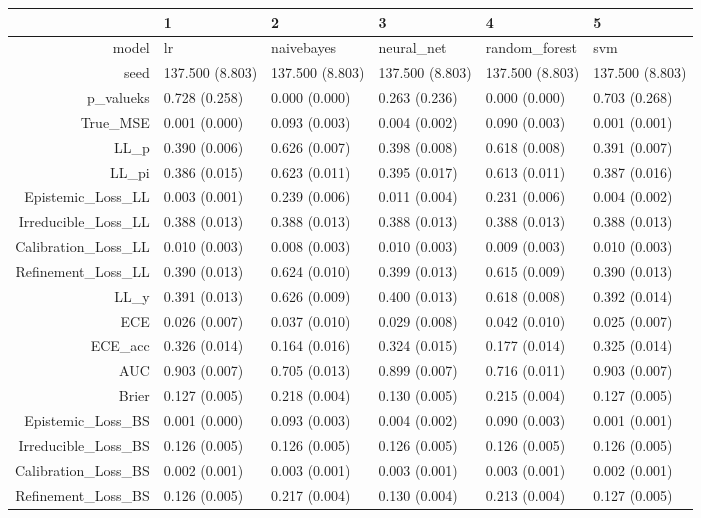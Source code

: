 \begin{table}[ht]
\centering
\begin{tabular}{rlllll}
  \hline
 & 1 & 2 & 3 & 4 & 5 \\ 
  \hline
model & lr & naivebayes & neural\_net & random\_forest & svm \\ 
  seed & 137.500 (8.803) & 137.500 (8.803) & 137.500 (8.803) & 137.500 (8.803) & 137.500 (8.803) \\ 
  p\_valueks & 0.728 (0.258) & 0.000 (0.000) & 0.263 (0.236) & 0.000 (0.000) & 0.703 (0.268) \\ 
  True\_MSE & 0.001 (0.000) & 0.093 (0.003) & 0.004 (0.002) & 0.090 (0.003) & 0.001 (0.001) \\ 
  LL\_p & 0.390 (0.006) & 0.626 (0.007) & 0.398 (0.008) & 0.618 (0.008) & 0.391 (0.007) \\ 
  LL\_pi & 0.386 (0.015) & 0.623 (0.011) & 0.395 (0.017) & 0.613 (0.011) & 0.387 (0.016) \\ 
  Epistemic\_Loss\_LL & 0.003 (0.001) & 0.239 (0.006) & 0.011 (0.004) & 0.231 (0.006) & 0.004 (0.002) \\ 
  Irreducible\_Loss\_LL & 0.388 (0.013) & 0.388 (0.013) & 0.388 (0.013) & 0.388 (0.013) & 0.388 (0.013) \\ 
  Calibration\_Loss\_LL & 0.010 (0.003) & 0.008 (0.003) & 0.010 (0.003) & 0.009 (0.003) & 0.010 (0.003) \\ 
  Refinement\_Loss\_LL & 0.390 (0.013) & 0.624 (0.010) & 0.399 (0.013) & 0.615 (0.009) & 0.390 (0.013) \\ 
  LL\_y & 0.391 (0.013) & 0.626 (0.009) & 0.400 (0.013) & 0.618 (0.008) & 0.392 (0.014) \\ 
  ECE & 0.026 (0.007) & 0.037 (0.010) & 0.029 (0.008) & 0.042 (0.010) & 0.025 (0.007) \\ 
  ECE\_acc & 0.326 (0.014) & 0.164 (0.016) & 0.324 (0.015) & 0.177 (0.014) & 0.325 (0.014) \\ 
  AUC & 0.903 (0.007) & 0.705 (0.013) & 0.899 (0.007) & 0.716 (0.011) & 0.903 (0.007) \\ 
  Brier & 0.127 (0.005) & 0.218 (0.004) & 0.130 (0.005) & 0.215 (0.004) & 0.127 (0.005) \\ 
  Epistemic\_Loss\_BS & 0.001 (0.000) & 0.093 (0.003) & 0.004 (0.002) & 0.090 (0.003) & 0.001 (0.001) \\ 
  Irreducible\_Loss\_BS & 0.126 (0.005) & 0.126 (0.005) & 0.126 (0.005) & 0.126 (0.005) & 0.126 (0.005) \\ 
  Calibration\_Loss\_BS & 0.002 (0.001) & 0.003 (0.001) & 0.003 (0.001) & 0.003 (0.001) & 0.002 (0.001) \\ 
  Refinement\_Loss\_BS & 0.126 (0.005) & 0.217 (0.004) & 0.130 (0.004) & 0.213 (0.004) & 0.127 (0.005) \\ 
   \hline
\end{tabular}
\end{table}
